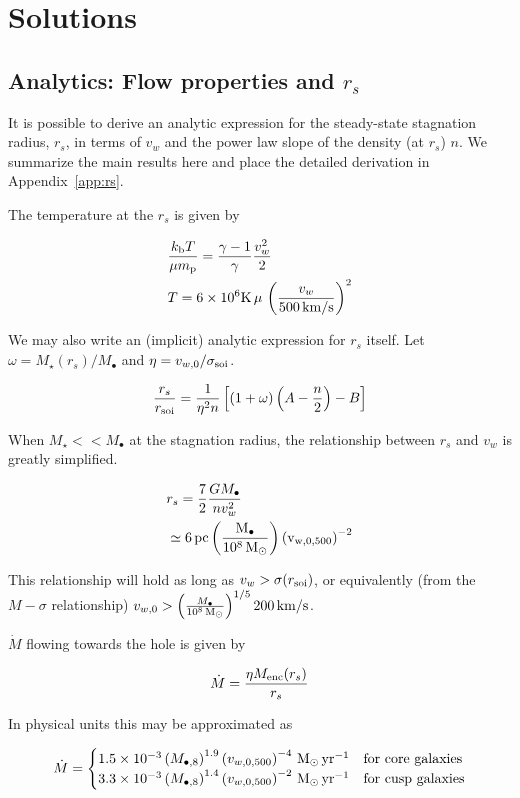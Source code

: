 \documentclass[usenatbib,fleqn]{mn2e}
\newcommand{\Mdot}{\dot{M}}
\newcommand{\rs}{r_s}
\newcommand{\vw}{v_w}
\newcommand{\kew}{\frac{v_w^2}{2}}
\newcommand{\gammafi}{\frac{\gamma-1}{\gamma}}
\newcommand{\kb}{k_{\rm b}}
\renewcommand{\mp}{m_{\rm p}}
\newcommand{\pc}{\rm pc}
\newcommand{\Menc}{M_{\rm enc}}
\newcommand{\Mstar}{M_{\star}}
\newcommand{\Mbh}[1][]{M_{\bullet#1}}
\newcommand{\Mbheight}{M_{\bullet,8}}
\newcommand{\MbhNorm}{\frac{\Mbh}{10^8 \Msun}}
\newcommand{\soi}{\rm soi}
\newcommand{\rsoi}{r_{\soi}}
\newcommand{\vwO}{v_{w,0}}
\newcommand{\x}{\frac{r_s}{\rsoi}}
\newcommand{\vwOFH}{v_{w,0,500}}
\newcommand{\pyear}{{\rm yr}^{-1}}
\begin{document}
\section{Solutions}
\subsection{Analytics: Flow properties and $\rs$}
It is possible to derive an analytic expression for the steady-state stagnation radius, $\rs$, in terms of $v_w$ and the power law slope of the density (at $\rs$) $n$.   We summarize the main results here and place the detailed derivation in Appendix~\ref{app:rs}.

The temperature at the $\rs$ is given by

\begin{align}
 &\frac{\kb T}{\mu \mp}=\gammafi \kew \label{eq:tstag}\\
 &T=6 \times 10^6 {\rm K} \, \mu \, \left({\frac{\vw}{500 \,{\rm km/s}}}\right)^2 
\end{align}

We may also write an (implicit) analytic expression for $\rs$ itself. Let $\omega=\Mstar(\rs)/\Mbh$ and  $\eta=v_{w,0}/\sigma_{\rm soi}$. 

\begin{align}
\x=\frac{1}{\eta^2 n}\left[ (1+\omega)\left(A-\frac{n}{2}\right)-B\right]
\label{eq:stag_analytic}
\end{align}

When $\Mstar << \Mbh$ at the stagnation radius, the relationship between $\rs$ and $\vw$ is greatly simplified. 

\begin{align}
&\rs=\frac{7}{2}\frac{G \Mbh}{n \vw^2}\\
&\simeq 6 \, \pc \left(\MbhNorm\right) \left(\vwOFH\right)^{-2}
\label{eq:stag_simple}
\end{align}

This relationship will hold as long as $\vw > \sigma(\rsoi)$, or equivalently (from the $M-\sigma$ relationship) $\vwO > \left(\frac{\Mbh}{10^8 \Msun}\right)^{1/5} 200 {\rm \,  km/s}$.

$\Mdot$ flowing towards the hole is given by

\begin{align}
\dot{M}=\frac{\eta \Menc(\rs)}{\rs}
\end{align}

In physical units this may be approximated as 

\[
\dot{M}=
\begin{cases}
   1.5 \times 10^{-3}  \left(\Mbheight\right)^{1.9} \left(\vwOFH\right)^{-4} \Msun \, \pyear& \text{for core galaxies} \\
   3.3 \times 10^{-3} \left(\Mbheight\right)^{1.4} \left(\vwOFH\right)^{-2}  \Msun \, \pyear  & \text{for cusp galaxies} 
\end{cases}
\label{eq:mdot_analytic}
\]
\end{document}
